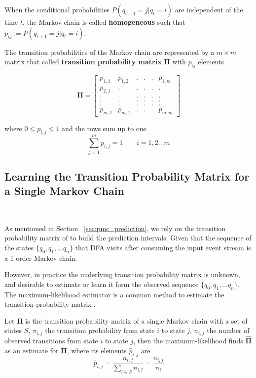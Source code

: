\par When the conditional probabilities $P(q_{t+1}=j|q_{t}=i)$ are independent of the time $t$, the Markov chain is called \textbf{homogeneous} such that $p_{ij}:=P(q_{t+1}=j|q_{t}=i)$.

The transition probabilities of the Markov chain are represented by a $m \times m$ matrix that called \textbf{transition probability matrix} $\boldsymbol{\Pi}$ with $p_{ij}$ elements


\begin{equation}
\label{eq:matrix_example}
\boldsymbol{\Pi} = 
\begin{bmatrix} 
p_{1,1}	   &p_{1,2}  &. 		&. 		& . &  	p_{1,m} \\
p_{2,1}		   &.  & .		& .	    & .	& . \\
. 		   &.  & .		& .	    & .	& . \\
.		   &.  & .		& .		& .	& . \\
.		   &.  & .		& .		& .	& .\\
p_{m,1}	   & p_{m,1}	&.		& .	& .	&p_{m,m}
\end{bmatrix}
\end{equation}

where $0 \leq p_{i,j}\leq 1 $ and the rows sum up to one 
\begin{equation}
\sum_{j=1}^{m} p_{i,j}= 1\ \ \ \ \ \ \ \ \ i=1,2 \ldots m
\end{equation}

\subsection{Learning the Transition Probability Matrix for a Single Markov Chain}
 \
\par As mentioned in Section ~\ref{sec:pmc_prediction}, we rely on the transition probability matrix of \pmcmr to build the prediction intervals. Given that the sequence of the states $\{q_0, q_1, \ldots q_n\}$ that DFA visits after consuming the input event stream is a 1-order Markov chain.


\par However, in practice the underlying transition probability matrix is unknown, and desirable to estimate or learn it form the observed sequence $\{q_0, q_1, \ldots q_n\}$. The maximum-likelihood estimator is a common method to estimate the transition probability matrix \cite{anderson1957statistical}.


\begin{definition}
	Let $\boldsymbol{\Pi}$ is the transition probability matrix of a single Markov chain with a set of states $S$, 
	$\pi_{i,j}$ the transition probability from state $i$ to state $j$,
	$n_{i,j}$ the number of observed transitions from state $i$ to state $j$,
	then the maximum-likelihood finds $\boldsymbol{\hat{\Pi}}$ as an estimate for $\boldsymbol{\Pi}$, where its elements $\hat{p}_{i,j}$ are
	\begin{equation}
	\label{eq:pi_estim}
	\hat{p}_{i,j}=\frac{n_{i,j}}{\sum_{l \in S} n_{i,l}}=\frac{n_{i,j}}{n_{i}}
	\end{equation}
	
\end{definition} 

